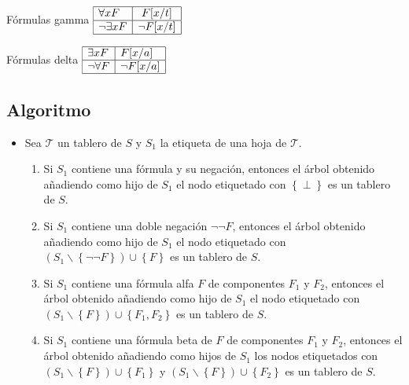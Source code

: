 \documentclass[aspectratio=169]{beamer}
\begin{document}
\begin{frame}[fragile]
\begin{center}    
    Fórmulas gamma \quad
    $\begin{array}{|l|c|} \hline
    \forall x F      & F [x/t]       \\ \hline
    \neg \exists x F & \neg F [x/t ] \\ \hline
     \end{array}$
     
     \vspace{5mm}

    Fórmulas delta \quad 
      $\begin{array}{|l|l|} \hline
    \exists x F    & F[x / a]       \\ \hline
    \neg \forall F & \neg F [x / a] \\ \hline
  \end{array}$
    
\end{center}    
\end{frame}

\subsection{Algoritmo}
\begin{frame}
\begin{itemize}
\item Sea $\mathcal{T}$ un tablero de $S$ y $S_1$ la etiqueta de
  una hoja  de $\mathcal{T}$.
  \begin{enumerate}
  \item Si $S_1$ contiene una fórmula y su negación, entonces el árbol
    obtenido añadiendo como hijo de $S_1$ el nodo etiquetado con
    $\left\{ \perp \right\}$ es un tablero de $S$.
  \item Si $S_1$ contiene una doble negación $\neg \neg F$, entonces
    el árbol obtenido añadiendo como hijo de $S_1$ el nodo etiquetado
    con $(S_1 \backslash \left\{\neg \neg F \right\})\cup \left\{ F \right\}$
    es un tablero de $S$.
  \item Si $S_1$ contiene una fórmula alfa $F$ de componentes $F_1$ y $F_2$,
    entonces el árbol obtenido añadiendo como hijo de $S_1$ el nodo etiquetado
    con $(S_1 \backslash \left\{ F \right\})\cup \left\{ F_1,F_2 \right\}$
    es un tablero de $S$.
  \item Si $S_1$ contiene una fórmula beta de $F$ de componentes $F_1$ y $F_2$,
    entonces el árbol obtenido añadiendo como hijos de $S_1$ los nodos
    etiquetados con $(S_1 \backslash \left\{ F \right\}) \cup \left\{ F_1 \right\}$ y
    $(S_1 \backslash \left\{ F \right\})\cup \left\{ F_2 \right\}$ es un tablero
    de $S$.
  \end{enumerate}
\end{itemize}  
\end{frame}
\end{document}
